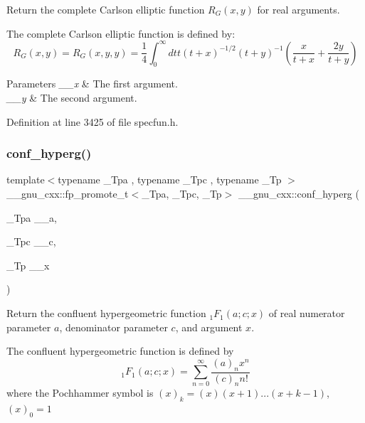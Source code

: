 Return the complete Carlson elliptic function $ R_G(x,y) $ for real arguments.

The complete Carlson elliptic function is defined by\+: \[ R_G(x,y) = R_G(x,y,y) = \frac{1}{4} \int_0^\infty dt t (t + x)^{-1/2}(t + y)^{-1} (\frac{x}{t + x} + \frac{2y}{t + y}) \]


\begin{DoxyParams}{Parameters}
{\em \+\_\+\+\_\+x} & The first argument. \\
\hline
{\em \+\_\+\+\_\+y} & The second argument. \\
\hline
\end{DoxyParams}


Definition at line 3425 of file specfun.\+h.

\mbox{\label{group__gnu__math__spec__func_ga4d01e85e7d295afca5d9f8b6c68f19cc}} 
\subsubsection{\texorpdfstring{conf\+\_\+hyperg()}{conf\_hyperg()}}
{\footnotesize\ttfamily template$<$typename \+\_\+\+Tpa , typename \+\_\+\+Tpc , typename \+\_\+\+Tp $>$ \\
\+\_\+\+\_\+gnu\+\_\+cxx\+::fp\+\_\+promote\+\_\+t$<$\+\_\+\+Tpa, \+\_\+\+Tpc, \+\_\+\+Tp$>$ \+\_\+\+\_\+gnu\+\_\+cxx\+::conf\+\_\+hyperg (\begin{DoxyParamCaption}\item[{\+\_\+\+Tpa}]{\+\_\+\+\_\+a,  }\item[{\+\_\+\+Tpc}]{\+\_\+\+\_\+c,  }\item[{\+\_\+\+Tp}]{\+\_\+\+\_\+x }\end{DoxyParamCaption})\hspace{0.3cm}{\ttfamily [inline]}}

Return the confluent hypergeometric function $ {}_1F_1(a;c;x) $ of real numerator parameter $ a $, denominator parameter $ c $, and argument $ x $.

The confluent hypergeometric function is defined by \[ {}_1F_1(a;c;x) = \sum_{n=0}^{\infty} \frac{(a)_n x^n}{(c)_n n!} \] where the Pochhammer symbol is $ (x)_k = (x)(x+1)...(x+k-1) $, $ (x)_0 = 1 $


